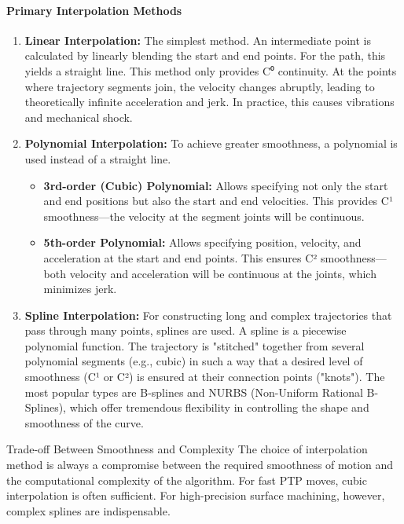 \paragraph{Primary Interpolation Methods}
\begin{enumerate}
    \item \textbf{Linear Interpolation:} The simplest method. An intermediate point is calculated by linearly blending the start and end points. For the path, this yields a straight line. This method only provides C⁰ continuity. At the points where trajectory segments join, the velocity changes abruptly, leading to theoretically infinite acceleration and jerk. In practice, this causes vibrations and mechanical shock.

    \item \textbf{Polynomial Interpolation:} To achieve greater smoothness, a polynomial is used instead of a straight line.
    \begin{itemize}
        \item \textbf{3rd-order (Cubic) Polynomial:} Allows specifying not only the start and end positions but also the start and end velocities. This provides C¹ smoothness—the velocity at the segment joints will be continuous.
        \item \textbf{5th-order Polynomial:} Allows specifying position, velocity, and acceleration at the start and end points. This ensures C² smoothness—both velocity and acceleration will be continuous at the joints, which minimizes jerk.
    \end{itemize}

    \item \textbf{Spline Interpolation:} For constructing long and complex trajectories that pass through many points, splines are used. A spline is a piecewise polynomial function. The trajectory is "stitched" together from several polynomial segments (e.g., cubic) in such a way that a desired level of smoothness (C¹ or C²) is ensured at their connection points ("knots"). The most popular types are B-splines and NURBS (Non-Uniform Rational B-Splines), which offer tremendous flexibility in controlling the shape and smoothness of the curve.
\end{enumerate}

\begin{tipbox}{Trade-off Between Smoothness and Complexity}
The choice of interpolation method is always a compromise between the required smoothness of motion and the computational complexity of the algorithm. For fast PTP moves, cubic interpolation is often sufficient. For high-precision surface machining, however, complex splines are indispensable.
\end{tipbox}

